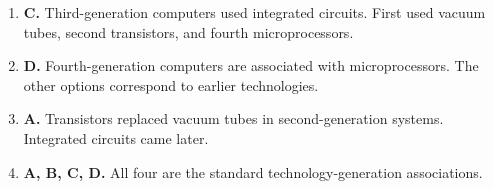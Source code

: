 \begin{enumerate}[label=\textbf{Q\arabic*.}, leftmargin=*]
\item \textbf{C.} Third-generation computers used integrated circuits. First used vacuum tubes, second transistors, and fourth microprocessors.

\item \textbf{D.} Fourth-generation computers are associated with microprocessors. The other options correspond to earlier technologies.

\item \textbf{A.} Transistors replaced vacuum tubes in second-generation systems. Integrated circuits came later.

\item \textbf{A, B, C, D.} All four are the standard technology-generation associations.

\end{enumerate}
